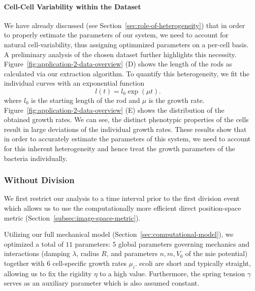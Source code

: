 \paragraph{Cell-Cell Variability within the Dataset}
\label{paragraph:parameter-estimation-individual-treatment}
We have already discussed (see Section~\ref{sec:role-of-heterogeneity}) that in order
to properly
estimate the parameters of our system, we need to account for natural cell-variability, thus
assigning optimmized parameters on a per-cell basis.
A preliminary analysis of the chosen dataset further highlights this necessity.
Figure~\ref{fig:application-2-data-overview} (D) shows the length of the rods as
calculated via our
extraction algorithm.
To quantify this heterogeneity, we fit the individual curves with an exponential function
\begin{equation}
    l(t) = l_0 \exp(\mu t).
    \label{eq:exponential-growth-model}
\end{equation}
where $l_0$ is the starting length of the rod and $\mu$ is the growth rate.
Figure~\ref{fig:application-2-data-overview} (E) shows the distribution of the
obtained growth rates.
We can see, the distinct phenotypic properties of the cells result in large deviations of the
individual growth rates.
These results show that in order to accurately estimate the parameters of this
system, we need to
account for this inherent heterogeneity and hence treat the growth parameters of the bacteria
individually.

\subsubsection{Without Division}

We first restrict our analysis to a time interval prior to the first division event
which allows us
to use the computationally more efficient direct position-space metric
(Section~\ref{subsec:image-space-metric}).

Utilizing our full mechanical model (Section~\ref{sec:computational-model}), we
optimized a total
of $11$ parameters: $5$ global parameters governing mechanics and interactions (damping
$\lambda$, radius $R$, and parameters $n,m,V_0$ of the mie potential) together with $6$
cell-specific growth rates $\mu_i$.
\ac{ecoli} are short and typically straight, allowing us to fix the rigidity $\eta$
to a high value.
Furthermore, the spring tension $\gamma$ serves as an auxiliary parameter which is also assumed
constant.

